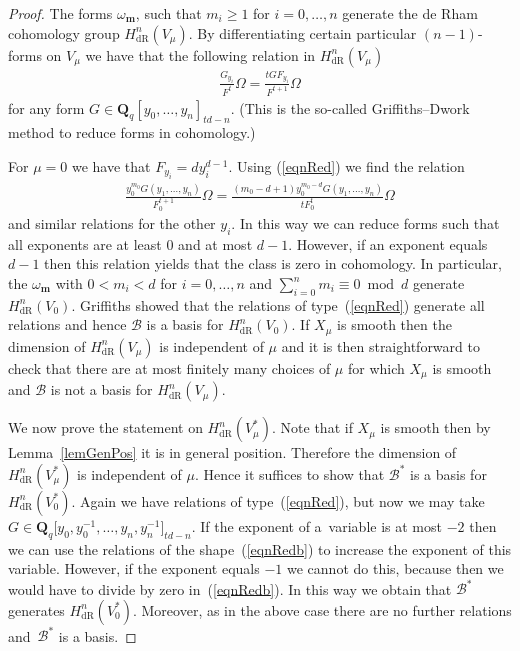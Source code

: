 \documentclass[pdftex]{sigma}
\numberwithin{equation}{section}
\DeclareMathOperator{\dR}{dR}
\begin{document}
\begin{proof} The forms $\omega_{\mathbf{m}}$, such that $m_i \geq 1$ for $i=0,\dots,n$ generate the de Rham cohomology group $H^n_{\dR}(V_\mu)$.
By dif\/ferentiating certain particular $(n-1)$-forms on $V_\mu$ we have that the following relation in $H^n_{\dR}(V_\mu)$
\begin{gather}\label{eqnRed} \frac{G_{y_i}}{F^t} \Omega = \frac{t G F_{y_i}}{F^{t+1}} \Omega \end{gather}
for any form $G\in \mathbf{Q}_q[y_0,\dots,y_n]_{td-n}$. (This is the so-called Grif\/f\/iths--Dwork method to reduce forms in cohomology.)

For $\mu=0$ we have that $F_{y_i}=dy_i^{d-1}$. Using (\ref{eqnRed}) we f\/ind the relation \begin{gather} \label{eqnRedb} \frac{y_0^{m_0} G(y_1,\dots,y_n)}{F_0^{t+1}}\Omega = \frac{(m_0-d+1)y_0^{m_0-d} G(y_1,\dots,y_n)}{t F_0^t} \Omega\end{gather}
and similar relations for the other $y_i$. In this way we can reduce forms such that all exponents are at least $0$ and at most $d-1$. However, if an exponent equals $d-1$ then this relation yields that the class is zero in cohomology. In particular, the $\omega_{\mathbf{m}}$ with $0<m_i<d$ for $i=0,\dots, n$ and $\sum\limits_{i=0}^n m_i\equiv 0 \bmod d$ generate $H^n_{\dR}(V_0)$. Grif\/f\/iths \cite{GriRat} showed that the relations of type~(\ref{eqnRed}) generate all relations and hence $\mathcal{B}$ is a basis for $H^n_{\dR}(V_0)$. If $X_\mu$ is smooth then the dimension of $H^n_{\dR}(V_\mu)$ is independent of $\mu$ and it is then straightforward to check that there are at most f\/initely many choices of $\mu$ for which $X_\mu$ is smooth and $\mathcal{B}$ is not a basis for $H^n_{\dR}(V_\mu)$.

We now prove the statement on $H^n_{\dR}(V_\mu^*)$. Note that if $X_\mu$ is smooth then by Lemma~\ref{lemGenPos} it is in general position. Therefore the dimension of $H^n_{\dR}(V_\mu^*)$ is independent of $\mu$. Hence it suf\/f\/ices to show that $\mathcal{B}^*$ is a basis for $H^n_{\dR}(V_0^*)$. Again we have relations of type~(\ref{eqnRed}), but now we may take $G\in \mathbf{Q}_q\big[y_0,y_0^{-1},\dots,y_n,y_n^{-1}\big]_{td-n}$. If the exponent of a~variable is at most $-2$ then we can use the relations of the shape~(\ref{eqnRedb}) to increase the exponent of this variable. However, if the exponent equals $-1$ we cannot do this, because then we would have to divide by zero in~(\ref{eqnRedb}). In this way we obtain that $\mathcal{B}^*$ generates $H^n_{\dR}(V^*_0)$. Moreover, as in the above case there are no further relations and~$\mathcal{B}^*$ is a basis.
\end{proof}
\end{document}
